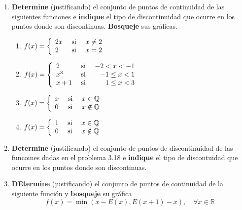 \documentclass[12pt]{article}
\begin{document}
\begin{enumerate}
    \item \textbf{Determine} (justificando) el conjunto de puntos de continuidad de las siguientes funciones e \textbf{indique} el tipo de discontinuidad que ocurre en los puntos donde son discontinuas. \textbf{Bosqueje} sus gráficas.
    \begin{enumerate}
        \item $f(x)=\left\{
            \begin{array}{lcr}
                2x & \textup{ si } & x\neq 2 \\
                2 & \textup{ si } & x=2\\
            \end{array}
        \right.$
        \item $f(x)=\left\{
            \begin{array}{lcr}
                2 & \textup{ si } & -2<x<-1 \\
                x^3 & \textup{ si } & -1\leq x<1 \\
                x+1 & \textup{ si } & 1\leq x<3 \\
            \end{array}
        \right.$
        \item $f(x)=\left\{
            \begin{array}{lcr}
                x & \textup{ si } & x\in\mathbb{Q} \\
                0 & \textup{ si } & x\notin\mathbb{Q} \\
            \end{array}
        \right.$
        \item $f(x)=\left\{
            \begin{array}{lcr}
                1 & \textup{ si } & x\in\mathbb{Q} \\
                0 & \textup{ si } & x\notin\mathbb{Q} \\
            \end{array}
        \right.$
    \end{enumerate}
    \item \textbf{Determine} (justificando) el conjunto de puntos de discontinuidad de las funcoines dadas en el problema 3.18 e \textbf{indique} el tipo de discontuidad que ocurre en los puntos donde son discontinuas.
    
    \item \textbf{DEtermine} (justificando) el conjunto de puntos de continuidad de la siguiente función y \textbf{bosqueje} su gráfica
    \begin{equation*}
        f(x)=\min(x-E(x),E(x+1)-x),\quad\forall x\in\mathbb{R}
    \end{equation*}


\end{enumerate}
\end{document}
